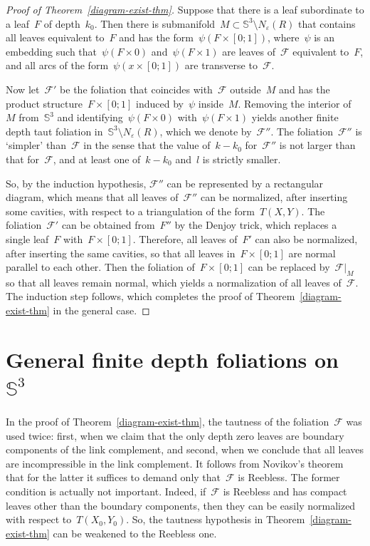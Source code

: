 \documentclass{amsart}
\theoremstyle{theorem}
\theoremstyle{remark}
\theoremstyle{definition}
\numberwithin{equation}{section}
\numberwithin{figure}{section}
\begin{document}
\begin{proof}[Proof of Theorem~\ref{diagram-exist-thm}]
Suppose that there is a leaf subordinate to a leaf~$F$ of depth~$k_0$. Then there is
submanifold~$M\subset\mathbb S^3\setminus N_\varepsilon(R)$ that contains all leaves equivalent to~$F$
and has the form~$\psi(F\times[0;1])$,
where~$\psi$ is an embedding such that~$\psi(F\times0)$ and~$\psi(F\times1)$ are leaves of~$\mathscr F$ equivalent to~$F$,
and all arcs of the form~$\psi(x\times[0;1])$ are transverse to~$\mathscr F$.

Now let~$\mathscr F'$ be the foliation that coincides with~$\mathscr F$ outside~$M$ and has the product
structure~$F\times[0;1]$ induced by~$\psi$ inside~$M$. Removing the interior of~$M$ from~$\mathbb S^3$ and identifying~$\psi(F\times0)$
with~$\psi(F\times1)$ yields another finite depth taut foliation in~$\mathbb S^3\setminus N_\varepsilon(R)$, which we denote by~$\mathscr F''$.
The foliation~$\mathscr F''$ is `simpler' than~$\mathscr F$ in the sense that the value of~$k-k_0$ for~$\mathscr F''$ is not larger
than that for~$\mathscr F$, and at least one of~$k-k_0$ and~$l$ is strictly smaller.

So, by the induction hypothesis, $\mathscr F''$ can be represented by a rectangular diagram, which means that
all leaves of~$\mathscr F''$ can be normalized,  after inserting some cavities, with respect to a triangulation of the form~$T(X,Y)$.
The foliation~$\mathscr F'$ can be obtained from~$F''$ by the Denjoy trick, which replaces a single leaf~$F$ with~$F\times[0;1]$.
Therefore, all leaves of~$F'$ can also be normalized, after inserting the same cavities, so that all leaves in~$F\times[0;1]$
are normal parallel to each other. Then the foliation of~$F\times[0;1]$ can be replaced by~$\mathscr F|_M$ so
that all leaves remain normal, which yields a normalization of all leaves of~$\mathscr F$. The induction step follows,
which completes the proof of Theorem~\ref{diagram-exist-thm} in the general case.
\end{proof}

\section{General finite depth foliations on~$\mathbb S^3$}\label{finite-depth-sec}
In the proof of Theorem~\ref{diagram-exist-thm}, the tautness of the foliation~$\mathscr F$ was used twice:
first, when we claim that the only depth zero leaves are boundary components of the link complement,
and second, when we conclude that all leaves are incompressible in the link complement. It follows from Novikov's theorem~\cite{novikov65}
that for the latter it suffices to demand only that~$\mathscr F$ is Reebless. The former condition is
actually not important. Indeed, if~$\mathscr F$ is Reebless and has compact leaves other than the boundary components, then
they can be easily normalized with respect to~$T(X_0,Y_0)$. So, the tautness hypothesis in
Theorem~\ref{diagram-exist-thm} can be weakened to the Reebless one.
\end{document}
